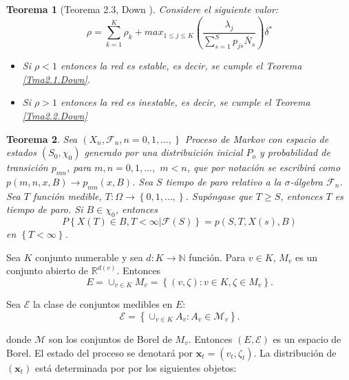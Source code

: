 \documentclass{article}
\newtheorem{Teo}{Teorema}
\newcommand{\nat}{\mathbb{N}}
\newcommand{\rea}{\mathbb{R}}
\begin{document}
\begin{Teo}[Teorema 2.3, Down \cite{Down}]\label{Tma2.3.Down}
Considere el siguiente valor:
\begin{equation}\label{Eq.Rho.1serv}
\rho=\sum_{k=1}^{K}\rho_{k}+max_{1\leq j\leq K}\left(\frac{\lambda_{j}}{\sum_{s=1}^{S}p_{js}\overline{N}_{s}}\right)\delta^{*}
\end{equation}
\begin{itemize}
\item[i)] Si $\rho<1$ entonces la red es estable, es decir, se cumple el Teorema \ref{Tma2.1.Down}.

\item[ii)] Si $\rho>1$ entonces la red es inestable, es decir, se cumple el Teorema \ref{Tma2.2.Down}
\end{itemize}
\end{Teo}

\begin{Teo}
Sea $\left(X_{n},\mathcal{F}_{n},n=0,1,\ldots,\right\}$ Proceso de
Markov con espacio de estados $\left(S_{0},\chi_{0}\right)$
generado por una distribuici\'on inicial $P_{o}$ y probabilidad de
transici\'on $p_{mn}$, para $m,n=0,1,\ldots,$ $m<n$, que por
notaci\'on se escribir\'a como $p\left(m,n,x,B\right)\rightarrow
p_{mn}\left(x,B\right)$. Sea $S$ tiempo de paro relativo a la
$\sigma$-\'algebra $\mathcal{F}_{n}$. Sea $T$ funci\'on medible,
$T:\Omega\rightarrow\left\{0,1,\ldots,\right\}$. Sup\'ongase que
$T\geq S$, entonces $T$ es tiempo de paro. Si $B\in\chi_{0}$,
entonces
\begin{equation}\label{Prop.Fuerte.Markov}
P\left\{X\left(T\right)\in
B,T<\infty|\mathcal{F}\left(S\right)\right\} =
p\left(S,T,X\left(s\right),B\right)
\end{equation}
en $\left\{T<\infty\right\}$.
\end{Teo}


Sea $K$ conjunto numerable y sea $d:K\rightarrow\nat$ funci\'on.
Para $v\in K$, $M_{v}$ es un conjunto abierto de
$\rea^{d\left(v\right)}$. Entonces \[E=\cup_{v\in
K}M_{v}=\left\{\left(v,\zeta\right):v\in K,\zeta\in
M_{v}\right\}.\]

Sea $\mathcal{E}$ la clase de conjuntos medibles en $E$:
\[\mathcal{E}=\left\{\cup_{v\in K}A_{v}:A_{v}\in \mathcal{M}_{v}\right\}.\]

donde $\mathcal{M}$ son los conjuntos de Borel de $M_{v}$.
Entonces $\left(E,\mathcal{E}\right)$ es un espacio de Borel. El
estado del proceso se denotar\'a por
$\mathbf{x}_{t}=\left(v_{t},\zeta_{t}\right)$. La distribuci\'on
de $\left(\mathbf{x}_{t}\right)$ est\'a determinada por por los
siguientes objetos:
\end{document}
